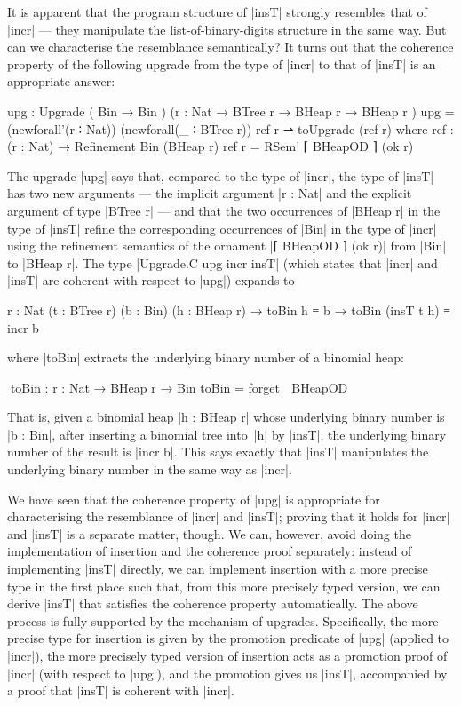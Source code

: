 It is apparent that the program structure of |insT| strongly resembles that of |incr| --- they manipulate the list-of-binary-digits structure in the same way.
But can we characterise the resemblance semantically?
It turns out that the coherence property of the following upgrade from the type of |incr| to that of |insT| is an appropriate answer:
\begin{code}
upg : Upgrade  (                       Bin      → Bin      )
               ({r : Nat} → BTree r →  BHeap r  → BHeap r  )
upg = (newforall'(r ∶ Nat)) (newforall(_ ∶ BTree r)) ref r ⇀ toUpgrade (ref r)
  where  ref : (r : Nat) → Refinement Bin (BHeap r)
         ref r = RSem' ⌈ BHeapOD ⌉ (ok r)
\end{code}
The upgrade |upg| says that, compared to the type of |incr|, the type of |insT| has two new arguments --- the implicit argument |r : Nat| and the explicit argument of type |BTree r| --- and that the two occurrences of |BHeap r| in the type of |insT| refine the corresponding occurrences of |Bin| in the type of |incr| using the refinement semantics of the ornament |⌈ BHeapOD ⌉ (ok r)| from |Bin| to |BHeap r|.
The type |Upgrade.C upg incr insT| (which states that |incr| and |insT| are coherent with respect to |upg|) expands to
\begin{code}
{r : Nat} (t : BTree r) (b : Bin) (h : BHeap r) →
toBin h ≡ b → toBin (insT t h) ≡ incr b
\end{code}
where |toBin| extracts the underlying binary number of a binomial heap:
\begin{code}
^^^toBin : {r : Nat} → BHeap r → Bin
toBin = forget ⌈ BHeapOD ⌉
\end{code}
That is, given a binomial heap |h : BHeap r| whose underlying binary number is |b : Bin|, after inserting a binomial tree into~|h| by |insT|, the underlying binary number of the result is |incr b|.
This says exactly that |insT| manipulates the underlying binary number in the same way as |incr|.

We have seen that the coherence property of |upg| is appropriate for characterising the resemblance of |incr| and |insT|; proving that it holds for |incr| and |insT| is a separate matter, though.
We can, however, avoid doing the implementation of insertion and the coherence proof separately:
instead of implementing |insT| directly, we can implement insertion with a more precise type in the first place such that, from this more precisely typed version, we can derive |insT| that satisfies the coherence property automatically.
The above process is fully supported by the mechanism of upgrades.
Specifically, the more precise type for insertion is given by the promotion predicate of |upg| (applied to |incr|), the more precisely typed version of insertion acts as a promotion proof of |incr| (with respect to |upg|), and the promotion gives us |insT|, accompanied by a proof that |insT| is coherent with |incr|.

